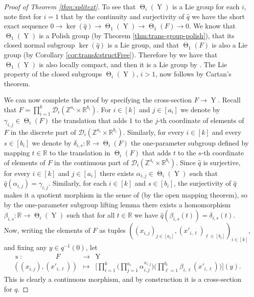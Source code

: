 \documentclass[a4paper,12pt,reqno]{amsart}
\theoremstyle{definition}
\def\to{\rightarrow}
\newcommand{\mc}{\mathcal}
\newcommand{\mb}{\mathbb}
\newcommand{\wh}{\widehat}
\DeclareMathOperator{\tran}{\Theta}
\DeclareMathOperator{\nss}{Y}
\DeclareMathOperator{\cs}{s}
\begin{document}
\begin{proof}[Proof of Theorem \ref{thm:splitext}]
To see that $\tran_i(\nss)$ is a Lie group for each $i$, note first for $i=1$ that by the continuity and surjectivity of $\wh{q}$ we have the short exact sequence 
$0\to \ker(\wh{q})\to \tran_1(\nss)\to \tran_1(F)\to 0$. 
We know that $\tran_1(\nss)$ is a Polish group (by Theorem \ref{thm:trans-group-polish}), that its closed normal subgroup $\ker(\wh{q})$ is a Lie group, and that $\tran_1(F)$ is also a Lie group (by Corollary \ref{cor:trans&structFree}). Therefore by \cite[Corollary A.2]{HK-non-conv} we have that $\tran_1(\nss)$ is also locally compact, and then it is a Lie group by \cite[Lemma A.3]{HK-non-conv}. The Lie property of the closed subgroups $\tran_i(\nss)$, $i>1$, now follows by Cartan's theorem.

We can now complete the proof by specifying the cross-section $F\to \nss$. Recall that $F=\prod_{i=1}^k \mc{D}_i(\mb{Z}^{a_i}\times \mb{R}^{b_i})$. For $i\in[k]$ and $j\in[a_i]$ we denote by $\gamma_{i,j}\in \tran_i(F)$ the translation that adds 1 to the $j$-th coordinate of elements of $F$ in the discrete part of $\mc{D}_i(\mb{Z}^{a_i}\times \mb{R}^{b_i})$. Similarly, for every $i\in[k]$ and every $s\in [b_i]$ we denote by $\delta_{i,s}:\mb{R}\to \tran_i(F)$ the one-parameter subgroup defined by mapping $t\in \mb{R}$ to the translation in $\tran_i(F)$ that adds $t$ to the $s$-th coordinate of elements of $F$ in the continuous part of  $\mc{D}_i(\mb{Z}^{a_i}\times \mb{R}^{b_i})$. Since $\wh{q}$ is surjective, for every $i\in[k]$ and $j\in[a_i]$ there exists  $\alpha_{i,j}\in \tran_i(\nss)$ such that $\wh{q}(\alpha_{i,j})= \gamma_{i,j}$. Similarly, for each $i\in[k]$ and $s\in [b_i]$, the surjectivity of $\wh{q}$ makes it a quotient morphism in the sense of \cite[p.\ 169]{H&M-ProLie} (by the open mapping theorem), so by the one-parameter subgroup lifting lemma \cite[Lemma 4.19]{H&M-ProLie} there exists a homomorphism $\beta_{i,s}:\mb{R}\to \tran_i(\nss)$ such that for all $t\in \mb{R}$ we have $\wh{q}(\beta_{i,s}(t))=\delta_{i,s}(t)$. Now, writing the elements of $F$ as tuples $((x_{i,j})_{j\in[a_i]},(x'_{i,\ell})_{\ell\in[b_i]})_{i\in [k]}$, and fixing any $y\in q^{-1}(0)$, let
\begin{eqnarray}\label{eq:maincrosssec}
\cs:\hspace{2cm}  F & \to & \nss \nonumber\\
 ((x_{i,j}),(x'_{i,\ell})) & \mapsto & \Big[\prod_{i=1}^k\Big(\prod_{j=1}^{a_i} \alpha_{i,j}^{x_{i,j}}\Big)\Big(\prod_{\ell=1}^{b_i} \beta_{i,\ell}(x'_{i,\ell})\Big)\Big] (y).
\end{eqnarray}
This is clearly a continuous morphism, and by construction  it is a cross-section for $q$.\end{proof}
\end{document}
